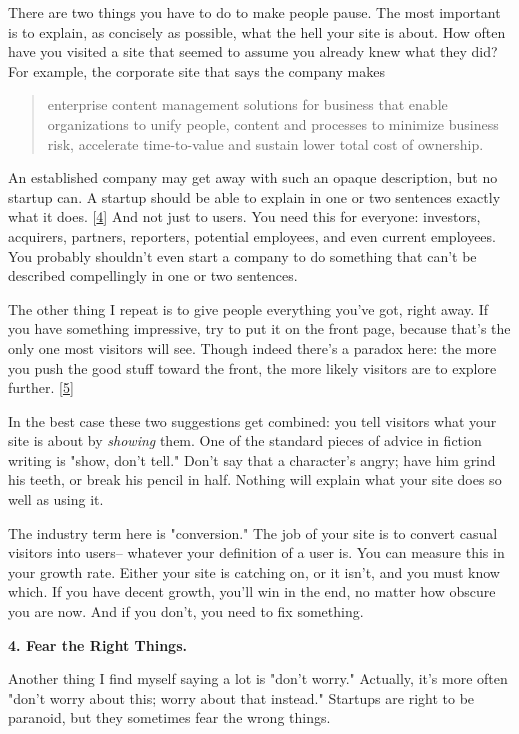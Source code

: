 There are two things you have to do to make people pause.  The most
important is to explain, as concisely as possible, what the hell
your site is about.  How often have you visited a site that seemed
to assume you already knew what they did?  For example, the corporate
site that says the
company makes
\begin{quote}

  enterprise content management solutions for business that enable
  organizations to unify people, content and processes to minimize
  business risk, accelerate time-to-value and sustain lower total
  cost of ownership.

\end{quote}

An established company may get away with such an opaque description,
but no startup can.  A startup
should be able to explain in one or two sentences exactly what it
does. 
[\href{\#f4n}{4}]
And not just to users.  You need this for everyone:
investors, acquirers, partners, reporters, potential employees, and
even current employees.  You probably shouldn't even start a company
to do something that can't be described compellingly in one or two
sentences.

The other thing I repeat is to give people everything you've got,
right away.  If you have something impressive, try to put it on the
front page, because that's the only one most visitors will see.
Though indeed there's a paradox here: the more you push the good
stuff toward the front, the more likely visitors are to explore
further. 
[\href{\#f5n}{5}]

In the best case these two suggestions get combined: you tell
visitors what your site is about by \emph{showing} them.  One of the
standard pieces of advice in fiction writing is "show, don't tell."
Don't say that a character's angry; have him grind his teeth, or
break his pencil in half.  Nothing will explain what your site does
so well as using it.

The industry term here is "conversion."  The job of your site is
to convert casual visitors into users-- whatever your definition
of a user is.  You can measure this in your growth rate.  Either
your site is catching on, or it isn't, and you must know which.  If
you have decent growth, you'll win in the end, no matter how obscure
you are now.  And if you don't, you need to fix something.


\textbf{4. Fear the Right Things.}

Another thing I find myself saying a lot is "don't worry."  Actually,
it's more often "don't worry about this; worry about that instead."
Startups are right to be paranoid, but they sometimes fear the wrong
things.

